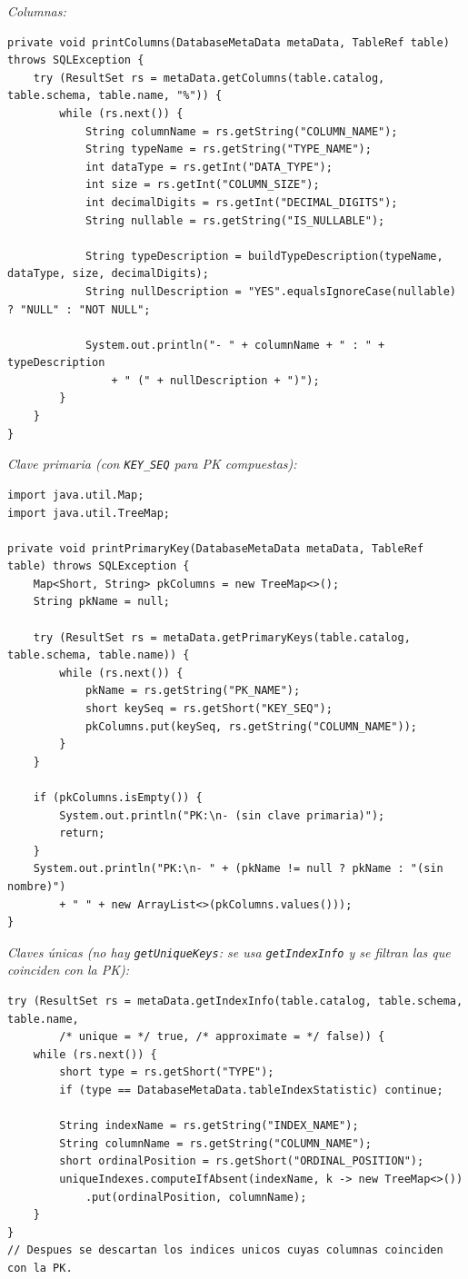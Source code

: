 \documentclass[11pt,a4paper]{article}
\begin{document}
\textit{Columnas:}

\begin{lstlisting}
private void printColumns(DatabaseMetaData metaData, TableRef table) throws SQLException {
    try (ResultSet rs = metaData.getColumns(table.catalog, table.schema, table.name, "%")) {
        while (rs.next()) {
            String columnName = rs.getString("COLUMN_NAME");
            String typeName = rs.getString("TYPE_NAME");
            int dataType = rs.getInt("DATA_TYPE");
            int size = rs.getInt("COLUMN_SIZE");
            int decimalDigits = rs.getInt("DECIMAL_DIGITS");
            String nullable = rs.getString("IS_NULLABLE");

            String typeDescription = buildTypeDescription(typeName, dataType, size, decimalDigits);
            String nullDescription = "YES".equalsIgnoreCase(nullable) ? "NULL" : "NOT NULL";

            System.out.println("- " + columnName + " : " + typeDescription
                + " (" + nullDescription + ")");
        }
    }
}
\end{lstlisting}

\textit{Clave primaria (con \texttt{KEY\_SEQ} para PK compuestas):}

\begin{lstlisting}
import java.util.Map;
import java.util.TreeMap;

private void printPrimaryKey(DatabaseMetaData metaData, TableRef table) throws SQLException {
    Map<Short, String> pkColumns = new TreeMap<>();
    String pkName = null;

    try (ResultSet rs = metaData.getPrimaryKeys(table.catalog, table.schema, table.name)) {
        while (rs.next()) {
            pkName = rs.getString("PK_NAME");
            short keySeq = rs.getShort("KEY_SEQ");
            pkColumns.put(keySeq, rs.getString("COLUMN_NAME"));
        }
    }

    if (pkColumns.isEmpty()) {
        System.out.println("PK:\n- (sin clave primaria)");
        return;
    }
    System.out.println("PK:\n- " + (pkName != null ? pkName : "(sin nombre)")
        + " " + new ArrayList<>(pkColumns.values()));
}
\end{lstlisting}

\textit{Claves únicas (no hay \texttt{getUniqueKeys}: se usa \texttt{getIndexInfo} y se filtran las que coinciden con la PK):}

\begin{lstlisting}
try (ResultSet rs = metaData.getIndexInfo(table.catalog, table.schema, table.name,
        /* unique = */ true, /* approximate = */ false)) {
    while (rs.next()) {
        short type = rs.getShort("TYPE");
        if (type == DatabaseMetaData.tableIndexStatistic) continue;

        String indexName = rs.getString("INDEX_NAME");
        String columnName = rs.getString("COLUMN_NAME");
        short ordinalPosition = rs.getShort("ORDINAL_POSITION");
        uniqueIndexes.computeIfAbsent(indexName, k -> new TreeMap<>())
            .put(ordinalPosition, columnName);
    }
}
// Despues se descartan los indices unicos cuyas columnas coinciden con la PK.
\end{lstlisting}
\end{document}
